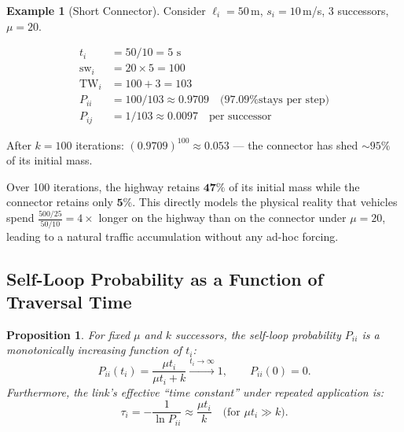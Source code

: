 \documentclass[12pt,a4paper]{article}
\theoremstyle{definition}
\newtheorem{example}{Example}[section]
\theoremstyle{plain}
\newtheorem{proposition}{Proposition}[section]
\newcommand{\sw}{\mathrm{sw}}
\newcommand{\TW}{\mathrm{TW}}
\begin{document}
\begin{example}[Short Connector]
  \label{ex:connector}
  Consider $\ell_i = 50$\,m, $s_i = 10$\,m/s, 3 successors, $\mu = 20$.

  \begin{align*}
    t_i &= 50 / 10 = 5\text{ s}\\
    \sw_i &= 20 \times 5 = 100\\
    \TW_i &= 100 + 3 = 103\\[4pt]
    P_{ii} &= 100 / 103 \approx 0.9709 \quad \text{(97.09\% stays per step)}\\
    P_{ij} &= 1   / 103 \approx 0.0097 \quad \text{per successor}
  \end{align*}

  After $k=100$ iterations: $(0.9709)^{100} \approx 0.053$ ---
  the connector has shed $\sim\!95\%$ of its initial mass.
\end{example}

\begin{insight}
  Over 100 iterations, the highway retains $\mathbf{47\%}$ of its initial mass while the
  connector retains only $\mathbf{5\%}$.  This directly models the physical reality that
  vehicles spend $\frac{500/25}{50/10} = 4\times$ longer on the highway than on the
  connector under $\mu\!=\!20$, leading to a natural traffic accumulation without any
  ad-hoc forcing.
\end{insight}

\subsection{Self-Loop Probability as a Function of Traversal Time}

\begin{proposition}
  For fixed $\mu$ and $k$ successors, the self-loop probability $P_{ii}$ is a
  monotonically increasing function of $t_i$:
  \begin{equation}
    P_{ii}(t_i) = \frac{\mu t_i}{\mu t_i + k}
    \xrightarrow{t_i \to \infty} 1, \qquad
    P_{ii}(0) = 0.
    \label{eq:pii_formula}
  \end{equation}
  Furthermore, the link's effective ``time constant'' under repeated application is:
  \begin{equation}
    \tau_i = -\frac{1}{\ln P_{ii}} \approx \frac{\mu t_i}{k}
    \quad \text{(for } \mu t_i \gg k\text{)}.
  \end{equation}
\end{proposition}
\end{document}
